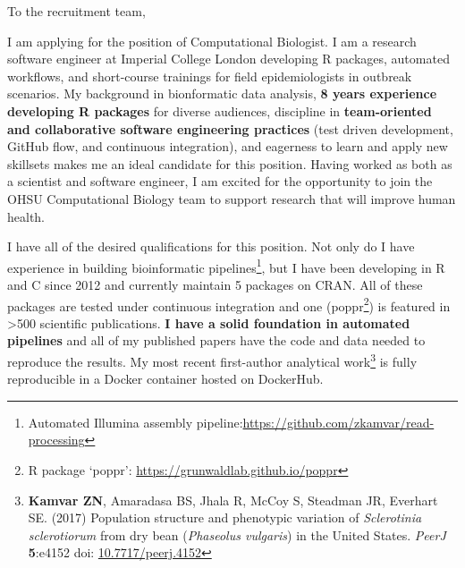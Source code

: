 



\vspace{1ex}
To the recruitment team,

\vspace{1ex}

I am applying for the position of Computational Biologist. I am a research
software engineer at Imperial College London developing R packages, automated
workflows, and short-course trainings for field epidemiologists in outbreak
scenarios. My background in bionformatic data analysis, \textbf{8 years
experience developing R packages} for diverse audiences, discipline in
\textbf{team-oriented and collaborative software engineering practices} (test
driven development, GitHub flow, and continuous integration), and eagerness to
learn and apply new skillsets makes me an ideal candidate for this position.
Having worked as both as a scientist and software engineer, I am excited for
the opportunity to join the OHSU Computational Biology team to support research
that will improve human health.

\vspace{1ex}

I have all of the desired qualifications for this position. Not only do I have
experience in building bioinformatic pipelines\footnote{Automated Illumina assembly pipeline:\url{https://github.com/zkamvar/read-processing}}, but I have been developing in R and C since 2012
and currently maintain 5 packages on CRAN. All of these packages are tested
under continuous integration and one
(poppr\footnote{R package `poppr': \url{https://grunwaldlab.github.io/poppr}}) is featured in
\textgreater500 scientific publications. \textbf{I have a solid foundation in automated
pipelines} and all of my published papers have the code and data needed to
reproduce the results. My most recent first-author analytical work\footnote{\textbf{Kamvar ZN}, Amaradasa BS, Jhala R, McCoy S, Steadman JR,
  Everhart SE. (2017) Population structure and phenotypic variation of
  \textit{Sclerotinia sclerotiorum} from dry bean (\textit{Phaseolus vulgaris})
  in the United States. \textit{PeerJ} \textbf{5}:e4152 doi: \href{https://doi.org/10.7717/peerj.4152}{10.7717/peerj.4152}}
is fully reproducible in a Docker container hosted on DockerHub.

